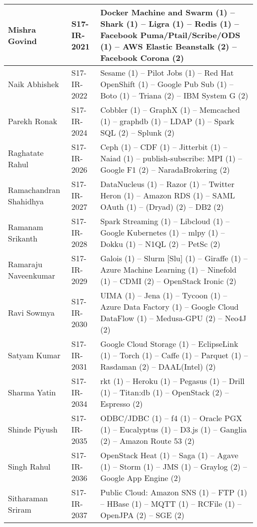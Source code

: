 \begin{longtable}{|*{3}{p{}|}}
\\
\hline
Mishra	Govind
&
S17-IR-2021
&
Docker Machine and Swarm (1) -- Shark (1) -- Ligra (1) -- Redis (1) -- Facebook Puma/Ptail/Scribe/ODS (1) -- AWS Elastic Beanstalk (2) -- Facebook Corona (2)
\\
\hline
Naik	Abhishek
&
S17-IR-2022
&
Sesame (1) -- Pilot Jobs (1) -- Red Hat OpenShift (1) -- Google Pub Sub (1) -- Boto (1) -- Triana (2) -- IBM System G (2)
\\
\hline
Parekh	Ronak
&
S17-IR-2024
&
Cobbler (1) -- GraphX (1) -- Memcached (1) -- graphdb (1) -- LDAP (1) -- Spark SQL (2) -- Splunk (2)
\\
\hline
Raghatate	Rahul
&
S17-IR-2026
&
Ceph (1) -- CDF (1) -- Jitterbit (1) -- Naiad (1) -- publish-subscribe: MPI (1) -- Google F1 (2) -- NaradaBrokering (2)
\\
\hline
Ramachandran	Shahidhya
&
S17-IR-2027
&
DataNucleus (1) -- Razor (1) -- Twitter Heron (1) -- Amazon RDS (1) -- SAML OAuth (1) -- (Dryad) (2) -- DB2 (2)
\\
\hline
Ramanam	Srikanth
&
S17-IR-2028
&
Spark Streaming (1) -- Libcloud (1) -- Google Kubernetes (1) -- mlpy (1) -- Dokku (1) -- N1QL (2) -- PetSc (2)
\\
\hline
Ramaraju	Naveenkumar
&
S17-IR-2029
&
Galois (1) -- Slurm {[}Slu{]} (1) -- Giraffe (1) -- Azure Machine Learning (1) -- Ninefold (1) -- CDMI (2) -- OpenStack Ironic (2)
\\
\hline
Ravi	Sowmya
&
S17-IR-2030
&
UIMA (1) -- Jena (1) -- Tycoon (1) -- Azure Data Factory (1) -- Google Cloud DataFlow (1) -- Medusa-GPU (2) -- Neo4J (2)
\\
\hline
Satyam	Kumar
&
S17-IR-2031
&
Google Cloud Storage (1) -- EclipseLink (1) -- Torch (1) -- Caffe (1) -- Parquet (1) -- Rasdaman (2) -- DAAL(Intel) (2)
\\
\hline
Sharma	Yatin
&
S17-IR-2034
&
rkt (1) -- Heroku (1) -- Pegasus (1) -- Drill (1) -- Titan:db (1) -- OpenStack (2) -- Espresso (2)
\\
\hline
Shinde	Piyush
&
S17-IR-2035
&
ODBC/JDBC (1) -- f4 (1) -- Oracle PGX (1) -- Eucalyptus (1) -- D3.js (1) -- Ganglia (2) -- Amazon Route 53 (2)
\\
\hline
Singh	Rahul
&
S17-IR-2036
&
OpenStack Heat (1) -- Saga (1) -- Agave (1) -- Storm (1) -- JMS (1) -- Graylog (2) -- Google App Engine (2)
\\
\hline
Sitharaman	Sriram
&
S17-IR-2037
&
Public Cloud: Amazon SNS (1) -- FTP (1) -- HBase (1) -- MQTT (1) -- RCFile (1) -- OpenJPA (2) -- SGE (2)
\\

\end{longtable}
